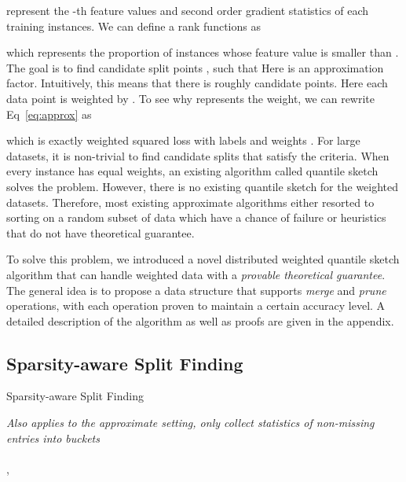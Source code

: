 \documentclass{sig-alternate-05-2015}
\begin{document}
represent the -th feature values and second order gradient statistics of each training instances.
We can define a rank functions  as

which represents the proportion of instances whose feature value  is smaller than .
The goal is to find candidate split points , such that
 \label{eq:quantile}
Here  is an approximation factor.
Intuitively, this means that there is roughly  candidate points.
Here each data point is weighted by .
To see why  represents the weight, we can rewrite  Eq~\eqref{eq:approx} as

which is exactly weighted squared loss with labels  and weights .
For large datasets, it is non-trivial to find candidate splits that satisfy the criteria.
When every instance has equal  weights, an existing algorithm called quantile sketch~\cite{Greenwald:SIGMOID01,Zhang:SSDBM}
solves the problem. However, there is no existing quantile sketch for the weighted datasets.
Therefore, most existing approximate algorithms either resorted to sorting on a random subset of data which have a chance of failure or heuristics that do not have theoretical guarantee.

To solve this problem, we introduced a novel distributed weighted quantile sketch algorithm that can handle weighted data with a
\emph{provable theoretical guarantee}. The general idea is to propose a data structure that supports \emph{merge} and \emph{prune}
operations, with each operation  proven to maintain a certain accuracy level.
A detailed description of the algorithm as well as proofs are given in the appendix.

\subsection{Sparsity-aware Split Finding} \label{subsec:sparse}


\begin{algorithm}[!t]
    \caption{Sparsity-aware Split Finding}\label{alg:sparse-split}
    \KwIn{}
    \emph{Also applies to the approximate setting, only collect statistics of non-missing entries into buckets}\\
    \\
    ,\\
\end{algorithm}
\end{document}

